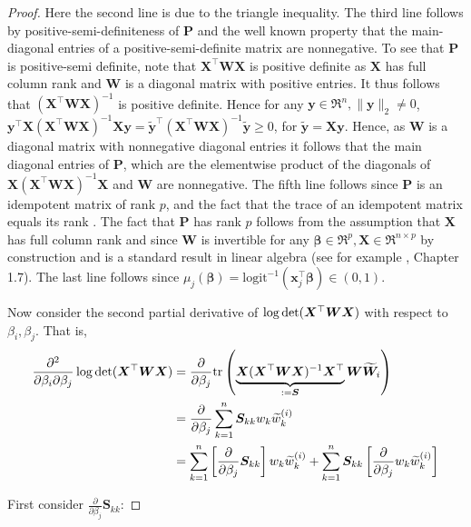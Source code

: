 \documentclass[11pt, a4paper]{article}
\newcommand*{\bb}{\boldsymbol}
\theoremstyle{example} \newtheorem{example}{Example}[section]
\theoremstyle{theorem} \newtheorem{theorem}{Theorem}[section]
\theoremstyle{theorem }\newtheorem{proposition}{Proposition}[section]
\theoremstyle{theorem }\newtheorem{corollary}{Corollary}[section]
\def\det{{\mathop{\rm det}}}
\def\\bbeta{\bb{\\bbeta}}
\def\by{\bb{y}}
\def\bX{\bb{X}}
\def\by{\bb{y}}
\begin{document}
\begin{proof}
Here the second line is due to the triangle inequality. The third line follows by positive-semi-definiteness of $\bb P$ and the well known property that the main-diagonal entries of a positive-semi-definite matrix are nonnegative. To see that $\bb P$ is positive-semi definite, note that $\bb X^\top\bb W\bb X$ is positive definite as $\bb X$ has full column rank and $\bb W$ is a diagonal matrix with positive entries. It thus follows that $(\bb X^\top\bb W\bb X)^{-1}$ is positive definite. Hence for any $\bb y \in \Re^{n}, \|\bb y\|_2\neq 0$, $\bb y^\top\bb X(\bb X^\top\bb W\bb X)^{-1}\bb X \bb y = \tilde{\bb y}^\top(\bb X^\top\bb W\bb X)^{-1} \tilde{\bb y} \geq 0$, for $\tilde{\by} = \bX \by$. Hence, as $\bb W$ is a diagonal matrix with nonnegative diagonal entries it follows that the main diagonal entries of $\bb P$, which are the elementwise product of the diagonals of $\bb X(\bb X^\top\bb W\bb X)^{-1}\bb X$ and $\bb W$ are nonnegative. The fifth line follows since $\bb P$ is an idempotent matrix of rank $p$, and the fact that the trace of an idempotent matrix equals its rank \citep[Corollary 10.2.2]{harville:1998}. The fact that $\bb P$ has rank $p$ follows from the assumption that $\bb X$ has full column rank and since $\bb W$ is invertible for any $\bb\beta \in \Re^p,\bb X\in \Re^{n \times p}$ by construction and is a standard result in linear algebra (see for example \cite{magnus+neudecker:2019}, Chapter 1.7).  The last line follows since $\mu_j(\bb\beta) = \textrm{logit}^{-1}(\bb x_j^{\top}\bb \beta) \in (0,1)$. 

Now consider the second partial derivative of $\log \det(\bb X^\top\bb W\bb X)$ with respect to $\beta_i,\beta_j$. That is, 
\begin{equation}
\begin{aligned}
\frac{\partial^2}{\partial \beta_i \partial \beta_j} \log\det (\bb X^\top\bb W \bb X) &= \frac{\partial}{\partial \beta_j} \textrm{tr}\left( \underbrace{\bb X(\bb X^\top\bb W\bb X)^{-1}\bb X^\top}_{:=\bb S}\bb W\widetilde{\bb W}_i\right) \\ 
&= \frac{\partial}{\partial \beta_j} \sum_{k=1}^{n}\bb S_{kk}w_k \widetilde{w}^{(i)}_k \\ 
&= \sum_{k=1}^{n}\left[\frac{\partial}{\partial \beta_j}\bb S_{kk}\right]w_k \widetilde{w}^{(i)}_k + \sum_{k=1}^{n}\bb S_{kk}\left[\frac{\partial}{\partial \beta_j}w_k \widetilde{w}^{(i)}_k\right]
\end{aligned}
\end{equation}

First consider $\frac{\partial}{\partial \beta_j}\bb S_{kk}$: 


\end{proof}
\end{document}
